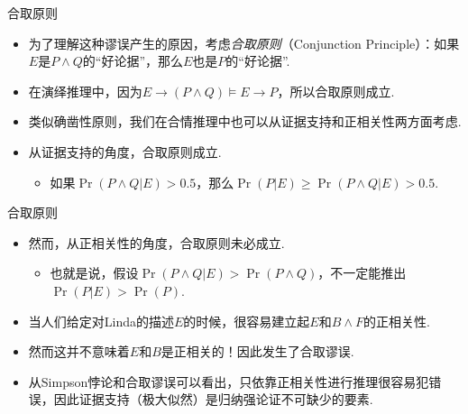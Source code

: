 {合取原则}
\begin{itemize}
    \item 为了理解这种谬误产生的原因，考虑\emph{合取原则}（Conjunction Principle）：如果$E$是$P\wedge Q$的``好论据''，那么$E$也是$P$的``好论据''.
    \item 在演绎推理中，因为$E\to(P\wedge Q)\models E\to P$，所以合取原则成立.
    \item 类似确凿性原则，我们在合情推理中也可以从证据支持和正相关性两方面考虑.
    \item 从证据支持的角度，合取原则成立.
    \begin{itemize}
        \item 如果$\Pr(P\wedge Q|E)>0.5$，那么$\Pr(P|E)\geq \Pr(P\wedge Q|E)>0.5$.
    \end{itemize}
\end{itemize}



{合取原则}
\begin{itemize}
    \item 然而，从正相关性的角度，合取原则未必成立.
    \begin{itemize}
        \item 也就是说，假设$\Pr(P\wedge Q|E)>\Pr(P\wedge Q)$，不一定能推出$\Pr(P|E)>\Pr(P)$.
    \end{itemize}
    \item 当人们给定对Linda的描述$E$的时候，很容易建立起$E$和$B\wedge F$的正相关性.
    \item 然而这并不意味着$E$和$B$是正相关的！因此发生了合取谬误.
    \item 从Simpson悖论和合取谬误可以看出，只依靠正相关性进行推理很容易犯错误，因此证据支持（极大似然）是归纳强论证不可缺少的要素.
\end{itemize}


